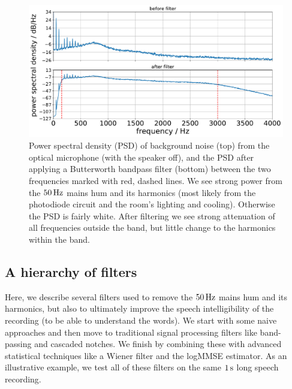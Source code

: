 \documentclass[paper-main.tex]{subfiles}
\begin{document}
\begin{figure}
	\includegraphics[width=.49\textwidth]{figures/psd_butterworth_14_6.pdf}
	\caption{\label{fig:psd_noise}
Power spectral density (PSD) of background noise (top) from the optical microphone (with the speaker off), and the PSD after applying a Butterworth bandpass filter (bottom) between the two frequencies marked with red, dashed lines. 
We see strong power from the $50\,{\rm Hz}$ mains hum and its harmonics (most likely from the photodiode circuit and the room’s lighting and cooling). Otherwise the PSD is fairly white. 
After filtering we see strong attenuation of all frequencies outside the band, but little change to the harmonics within the band.
}
\end{figure}


\subsection{A hierarchy of filters}
\label{sec:filters}

Here, we describe several filters used to remove the $50\,{\rm Hz}$ mains hum and its harmonics, but also to ultimately improve the speech intelligibility of the recording (to be able to understand the words). We start with some naive approaches and then move to traditional signal processing filters like band-passing and cascaded notches. We finish by combining these with advanced statistical techniques like a Wiener filter and the logMMSE estimator. As an illustrative example, we test all of these filters on the same $1\,{\rm s}$ long speech recording.
\end{document}

